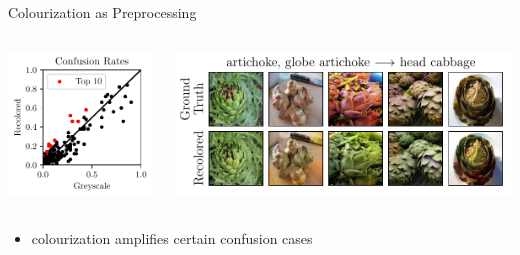 \documentclass{beamer}
\begin{document}
\begin{frame}{Colourization as Preprocessing}
  \begin{columns}
    \begin{column}{0.4\textwidth}
      \includegraphics[width=\textwidth]{resources/confusion_rates.pdf}
    \end{column}
    \begin{column}{0.6\textwidth}
      \includegraphics[width=\textwidth]{resources/common_confusions.pdf}
    \end{column}
  \end{columns}

  \medskip

  \begin{itemize}
    \item colourization amplifies certain confusion cases
  \end{itemize}
\end{frame}
\end{document}
